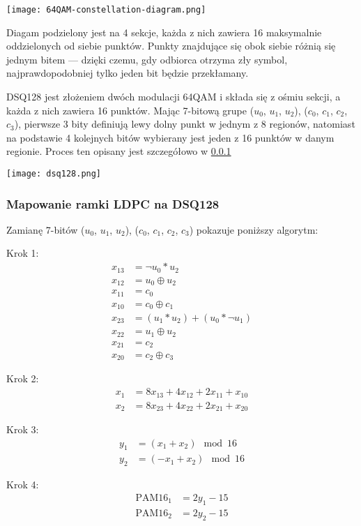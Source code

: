 \texttt{[image: 64QAM-constellation-diagram.png]}

Diagam podzielony jest na 4 sekcje, każda z nich zawiera 16 maksymalnie oddzielonych od siebie punktów. Punkty znajdujące się obok siebie różnią się jednym bitem --- dzięki czemu, gdy odbiorca otrzyma zły symbol, najprawdopodobniej tylko jeden bit będzie przekłamany.

DSQ128 jest złożeniem dwóch modulacji 64QAM i składa się z ośmiu sekcji, a każda z nich zawiera 16 punktów. Mając 7-bitową grupe ($u_0$, $u_1$, $u_2$), ($c_0$, $c_1$, $c_2$, $c_3$), pierwsze 3 bity definiują lewy dolny punkt w jednym z 8 regionów, natomiast na podstawie 4 kolejnych bitów wybierany jest jeden z 16 punktów w danym regionie. Proces ten opisany jest szczegółowo w \ref{mapowanie}

\texttt{[image: dsq128.png]}

\subsubsection{Mapowanie ramki LDPC na DSQ128}\label{mapowanie}
Zamianę 7-bitów ($u_0$, $u_1$, $u_2$), ($c_0$, $c_1$, $c_2$, $c_3$) pokazuje poniższy algorytm:

Krok 1:
\begin{align*}
    x_{13} &= \neg u_0 * u_2 \\
    x_{12} &= u_0 \oplus u_2 \\
    x_{11} &= c_0 \\
    x_{10} &= c_0 \oplus c_1 \\
    x_{23} &= (u_1 * u_2) + (u_0 * \neg u_1) \\
    x_{22} &= u_1 \oplus u_2 \\
    x_{21} &= c_2 \\
    x_{20} &= c_2 \oplus c_3
\end{align*}

Krok 2:
\begin{align*}
    x_1 &= 8x_{13} + 4x_{12} + 2x_{11} + x_{10} \\
    x_2 &= 8x_{23} + 4x_{22} + 2x_{21} + x_{20}
\end{align*}

Krok 3:
\begin{align*}
    y_1 &= (x_1 + x_2) \mod 16 \\
    y_2 &= (-x_1 + x_2) \mod 16
\end{align*}

Krok 4:
\begin{align*}
    \text{PAM16}_1 &= 2y_1 - 15 \\
    \text{PAM16}_2 &= 2y_2 - 15
\end{align*}


